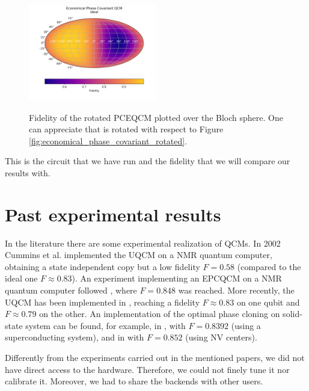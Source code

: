 \begin{figure}[H]
    \centering
            \includegraphics[width=0.5\textwidth]{Figures/economical_phase_covariant.png}
        \label{fig:economical_phase_covariant}
        \caption{Fidelity of the rotated PCEQCM plotted over the Bloch sphere. One can appreciate that is rotated with respect to Figure \ref{fig:economical_phase_covariant_rotated}.}
\end{figure}
This is the circuit that we have run and the fidelity that we will compare our results with.

\section{Past experimental results}
In the literature there are some experimental realization of QCMs. 
In 2002 Cummins et al. \cite{UQCMwithNMR} implemented the UQCM on a NMR quantum computer, obtaining a state independent copy but a low fidelity $F=0.58$ (compared to the ideal one $F \approx 0.83$).
An experiment implementing an EPCQCM on a NMR quantum computer followed \cite{EPCQCMwithNMR}, where $F=0.848$ was reached.
More recently, the UQCM has been implemented in \cite{UQCMwithSuperconducting}, reaching a fidelity $F\approx 0.83$ on one qubit and $F\approx 0.79$ on the other.
An implementation of the optimal phase cloning on solid-state system can be found, for example, in \cite{PCQCMwithSuperconducting}, with $F=0.8392$ (using a superconducting system), and in \cite{PCQCMwithNV} with $F=0.852$ (using NV centers).

Differently from the experiments carried out in the mentioned papers, we did not have direct access to the hardware. 
Therefore, we could not finely tune it nor calibrate it. Moreover, we had to share the backends with other users.
